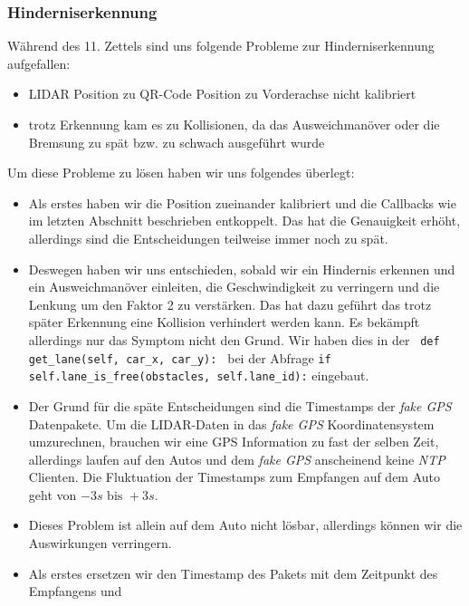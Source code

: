 \documentclass[10pt,oneside,a4paper]{article}
\begin{document}
      \subsubsection{Hinderniserkennung}
        W\"ahrend des 11. Zettels sind uns folgende Probleme zur Hinderniserkennung aufgefallen:
        \begin{itemize}
          \item LIDAR Position zu QR-Code Position zu Vorderachse nicht kalibriert
          \item trotz Erkennung kam es zu Kollisionen, da das Ausweichman\"over oder die Bremsung zu sp\"at bzw. zu schwach ausgef\"uhrt wurde
        \end{itemize}
        Um diese Probleme zu lösen haben wir uns folgendes überlegt:
        \begin{itemize}
            \item Als erstes haben wir die Position zueinander kalibriert und die Callbacks wie im letzten
            Abschnitt beschrieben entkoppelt. Das hat die Genauigkeit erh\"oht, allerdings sind die
            Entscheidungen teilweise immer noch zu sp\"at.
            \item Deswegen haben wir uns entschieden, sobald wir ein Hindernis erkennen und ein Ausweichman\"over einleiten, die Geschwindigkeit zu verringern und die Lenkung um den Faktor 2 zu
            verst\"arken. Das hat dazu gef\"uhrt das trotz sp\"ater Erkennung eine Kollision verhindert
            werden kann. Es bek\"ampft allerdings nur das Symptom nicht den Grund.
            Wir haben dies in der \texttt{ def get_lane(self, car_x, car_y): } bei der Abfrage 
            \texttt{if self.lane_is_free(obstacles, self.lane_id):} eingebaut.
            \item Der Grund f\"ur die sp\"ate Entscheidungen sind die Timestamps der \emph{fake GPS}
            Datenpakete. Um die LIDAR-Daten in das \emph{fake GPS} Koordinatensystem umzurechnen,
            brauchen wir eine GPS Information zu fast der selben Zeit, allerdings laufen auf den Autos
            und dem \emph{fake GPS} anscheinend keine \emph{NTP} Clienten. Die Fluktuation der
            Timestamps zum Empfangen auf dem Auto geht von $- 3s \text{ bis } + 3s$.
            \item Dieses Problem ist allein auf dem Auto nicht l\"osbar, allerdings k\"onnen wir die
            Auswirkungen verringern.
            \item Als erstes ersetzen wir den Timestamp des Pakets mit dem Zeitpunkt des Empfangens und

\end{itemize}
\end{document}
